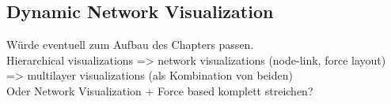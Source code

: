 \subsection{Dynamic Network Visualization}
Würde eventuell zum Aufbau des Chapters passen. \\
Hierarchical visualizations => network visualizations (node-link, force layout) => multilayer visualizations (als Kombination von beiden)\\
Oder Network Visualization + Force based komplett streichen?

